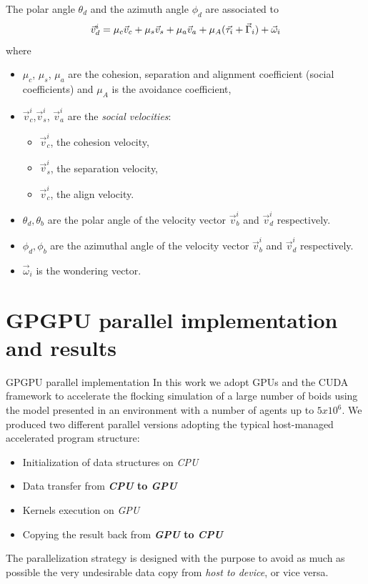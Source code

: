 \documentclass{beamer}
\begin{document}
\begin{frame}
The polar angle $\theta_d$ and the azimuth angle $\phi_d$ are associated to 
\begin{equation}
 \vec{v}_d^i = \mu_c \vec{v}_c + \mu_s\vec{v}_s + \mu_a \vec{v}_a + \mu_{A} (
\vec{{\tau}_i} + \vec{\Gamma}_i ) + \vec{\omega}_i \notag
\end{equation}
 where

\begin{itemize}
	\item $\mu_c$, $\mu_s$, $\mu_a$ are the cohesion, separation and alignment coefficient (social coefficients) and $\mu_A$ is the avoidance coefficient,

\item  $\vec{v}^i_c$,$\vec{v}^i_s$, $\vec{v}^i_a$ are the  \textit{social velocities}: 
    \begin{itemize}
    \item $\vec{v}^i_c$, the cohesion velocity,
    \item $\vec{v}^i_s$, the separation velocity, 
    \item  $\vec{v}^i_c$, the align velocity.

    \end{itemize}
    
\item  $\theta_d,\theta_b$ are the polar angle of the velocity vector
  $\vec{v}^i_b$ and $\vec{v}^i_d$ respectively.
\item $\phi_d,\phi_b$ are the azimuthal angle of the velocity vector
  $\vec{v}^i_b$ and $\vec{v}^i_d$ respectively.
  \item $\vec{\omega}_i$ is the wondering vector.
\end{itemize}
\end{frame}


\section{GPGPU parallel implementation and results}
\begin{frame}{GPGPU parallel implementation }
In this work we adopt GPUs and the CUDA framework to
accelerate the flocking simulation of a large number of boids
using the model presented  in an environment
with a number of agents up to $5x10^6$. 
We produced two different parallel
versions adopting the typical host-managed accelerated
program structure:
\begin{itemize}
	\item Initialization of data structures on \emph{CPU}
	\item Data transfer from \textbf{\emph{CPU} to \emph{GPU}}
	\item Kernels execution on \emph{GPU}
	\item Copying the result back from \textbf{\emph{GPU} to \emph{CPU}}
\end{itemize}
The parallelization strategy is designed with the purpose to avoid as much
as possible the very undesirable data copy from \emph{host to device}, or vice versa.

\end{frame}
\end{document}
